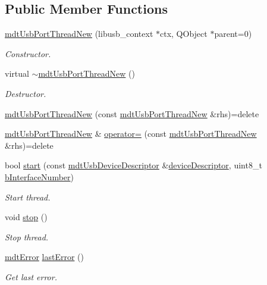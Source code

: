 \subsection*{Public Member Functions}
\begin{DoxyCompactItemize}
\item 
\hyperlink{classmdt_usb_port_thread_new_a42db5d14d8102d5a05b484692b28f353}{mdt\-Usb\-Port\-Thread\-New} (libusb\-\_\-context $\ast$ctx, Q\-Object $\ast$parent=0)
\begin{DoxyCompactList}\small\item\em Constructor. \end{DoxyCompactList}\item 
virtual \hyperlink{classmdt_usb_port_thread_new_a1f08c280502406418093be95e85415bc}{$\sim$mdt\-Usb\-Port\-Thread\-New} ()
\begin{DoxyCompactList}\small\item\em Destructor. \end{DoxyCompactList}\item 
\hyperlink{classmdt_usb_port_thread_new_a28beaed16b04754a158e3ed4b921ff03}{mdt\-Usb\-Port\-Thread\-New} (const \hyperlink{classmdt_usb_port_thread_new}{mdt\-Usb\-Port\-Thread\-New} \&rhs)=delete
\item 
\hyperlink{classmdt_usb_port_thread_new}{mdt\-Usb\-Port\-Thread\-New} \& \hyperlink{classmdt_usb_port_thread_new_a61525f464e0dc79c69afce302ef711b0}{operator=} (const \hyperlink{classmdt_usb_port_thread_new}{mdt\-Usb\-Port\-Thread\-New} \&rhs)=delete
\item 
bool \hyperlink{classmdt_usb_port_thread_new_ac0b2946c973dddcbb19dd26941df2ca5}{start} (const \hyperlink{classmdt_usb_device_descriptor}{mdt\-Usb\-Device\-Descriptor} \&\hyperlink{classmdt_usb_port_thread_new_a26e376f505b24f796e485361b4f36740}{device\-Descriptor}, uint8\-\_\-t \hyperlink{classmdt_usb_port_thread_new_a473cc8ad9fa93d9c5a94b2f700a5311d}{b\-Interface\-Number})
\begin{DoxyCompactList}\small\item\em Start thread. \end{DoxyCompactList}\item 
void \hyperlink{classmdt_usb_port_thread_new_a10437cf919cc678a8aae348763ee682d}{stop} ()
\begin{DoxyCompactList}\small\item\em Stop thread. \end{DoxyCompactList}\item 
\hyperlink{classmdt_error}{mdt\-Error} \hyperlink{classmdt_usb_port_thread_new_aec47aab80aaaea81cd1b8eb4dfc1bda3}{last\-Error} ()
\begin{DoxyCompactList}\small\item\em Get last error. \end{DoxyCompactList}\end{DoxyCompactItemize}

